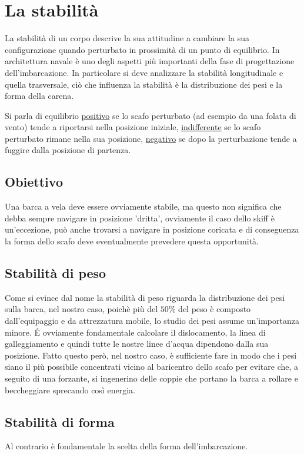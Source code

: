 \chapter{La stabilità}

La stabilità di un corpo descrive la sua attitudine a cambiare la sua configurazione quando perturbato in prossimità di un punto di equilibrio. In architettura navale è uno degli aspetti più importanti della fase di progettazione dell'imbarcazione.
In particolare si deve analizzare la stabilità longitudinale e quella trasversale, ciò che influenza la stabilità è la distribuzione dei pesi e la forma della carena.

Si parla di equilibrio \underline{positivo} se lo scafo perturbato (ad esempio da una folata di vento) tende a riportarsi nella posizione iniziale, \underline{indifferente} se lo scafo perturbato rimane nella sua posizione, \underline{negativo} se dopo la perturbazione tende a fuggire dalla posizione di partenza.

	\section{Obiettivo}
	Una barca a vela deve essere ovviamente stabile, ma questo non significa che debba sempre navigare in posizione 'dritta', ovviamente il caso dello skiff è un'eccezione, può anche trovarsi a navigare in posizione coricata e di conseguenza la forma dello scafo deve eventualmente prevedere questa opportunità.

	\section{Stabilità di peso}
	Come si evince dal nome la stabilità di peso riguarda la distribuzione dei pesi sulla barca, nel nostro caso, poichè più del $50\%$ del peso è composto dall'equipaggio e da attrezzatura mobile, lo studio dei pesi assume un'importanza minore.
	\'E ovviamente fondamentale calcolare il dislocamento, la linea di galleggiamento e quindi tutte le nostre linee d'acqua dipendono dalla sua posizione. Fatto questo però, nel nostro caso, è sufficiente fare in modo che i pesi siano il più possibile concentrati vicino al baricentro dello scafo per evitare che, a seguito di una forzante, si ingenerino delle coppie che portano la barca a rollare e beccheggiare sprecando così energia.
	
	\section{Stabilità di forma}
	Al contrario è fondamentale la scelta della forma dell'imbarcazione.



